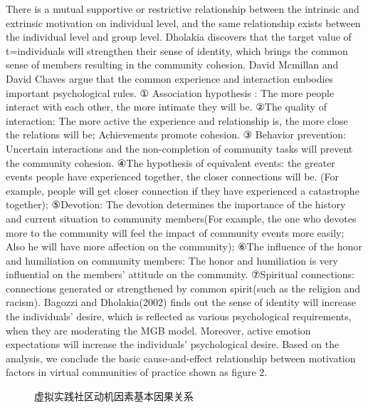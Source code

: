 \documentclass{elsarticle}
\begin{document}
There is a mutual supportive or restrictive relationship between the
intrinsic and extrinsic motivation on individual level, and the same
relationship exists between the individual level and group
level. Dholakia discovers that the target value of t=individuals will
strengthen their sense of identity, which brings the common sense of
members resulting in the community cohesion\cite{dholakia2004sim}. David Mcmillan and David
Chaves argue that the common experience and interaction embodies
important psychological rules. ① Association hypothesis : The more
people interact with each other, the more intimate they will be. ②The
quality of interaction: The more active the experience and
relationship is, the more close the relations will be; Achievements
promote cohesion. ③ Behavior prevention: Uncertain interactions and
the non-completion of community tasks will prevent the community
cohesion. ④The hypothesis of equivalent events: the greater events
people have experienced together, the closer connections will be. (For
example, people will get closer connection if they have experienced a
catastrophe together); ⑤Devotion: The devotion determines the
importance of the history and current situation to community
members(For example, the one who devotes more to the community will
feel the impact of community events more easily; Also he will have
more affection on the community); ⑥The influence of the honor and
humiliation on community members: The honor and humiliation is very
influential on the members’ attitude on the community. ⑦Spiritual
connections: connections generated or strengthened by common
spirit(such as the religion and racism)\cite{mcmillan1986scd}. Bagozzi and
Dholakia(2002) finds out the sense of identity will increase the
individuals’ desire, which is reflected as various psychological
requirements, when they are moderating the MGB model. Moreover, active
emotion expectations will increase the individuals’ psychological
desire\cite{richard_p._bagozzi_intentional_2002}. Based on the analysis, we conclude the basic
cause-and-effect relationship between motivation factors in virtual
communities of practice shown as figure 2.
\begin{figure}[htpb]
  \centering
  \label{fig:cause-and-effect}
  \caption{虚拟实践社区动机因素基本因果关系}
\end{figure}
\end{document}
